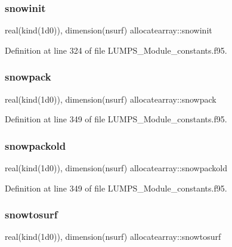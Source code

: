 \subsubsection{\texorpdfstring{snowinit}{snowinit}}
{\footnotesize\ttfamily real(kind(1d0)), dimension(nsurf) allocatearray\+::snowinit}



Definition at line 324 of file L\+U\+M\+P\+S\+\_\+\+Module\+\_\+constants.\+f95.

\mbox{\label{namespaceallocatearray_a0c3675a79f0c6c3921beb95eb4d9d48f}} 
\subsubsection{\texorpdfstring{snowpack}{snowpack}}
{\footnotesize\ttfamily real(kind(1d0)), dimension(nsurf) allocatearray\+::snowpack}



Definition at line 349 of file L\+U\+M\+P\+S\+\_\+\+Module\+\_\+constants.\+f95.

\mbox{\label{namespaceallocatearray_a57efc99803853059b05e3ad2f8c7b369}} 
\subsubsection{\texorpdfstring{snowpackold}{snowpackold}}
{\footnotesize\ttfamily real(kind(1d0)), dimension(nsurf) allocatearray\+::snowpackold}



Definition at line 349 of file L\+U\+M\+P\+S\+\_\+\+Module\+\_\+constants.\+f95.

\mbox{\label{namespaceallocatearray_aeddb481b8d76a9bd63fcc32506360636}} 
\subsubsection{\texorpdfstring{snowtosurf}{snowtosurf}}
{\footnotesize\ttfamily real(kind(1d0)), dimension(nsurf) allocatearray\+::snowtosurf}



